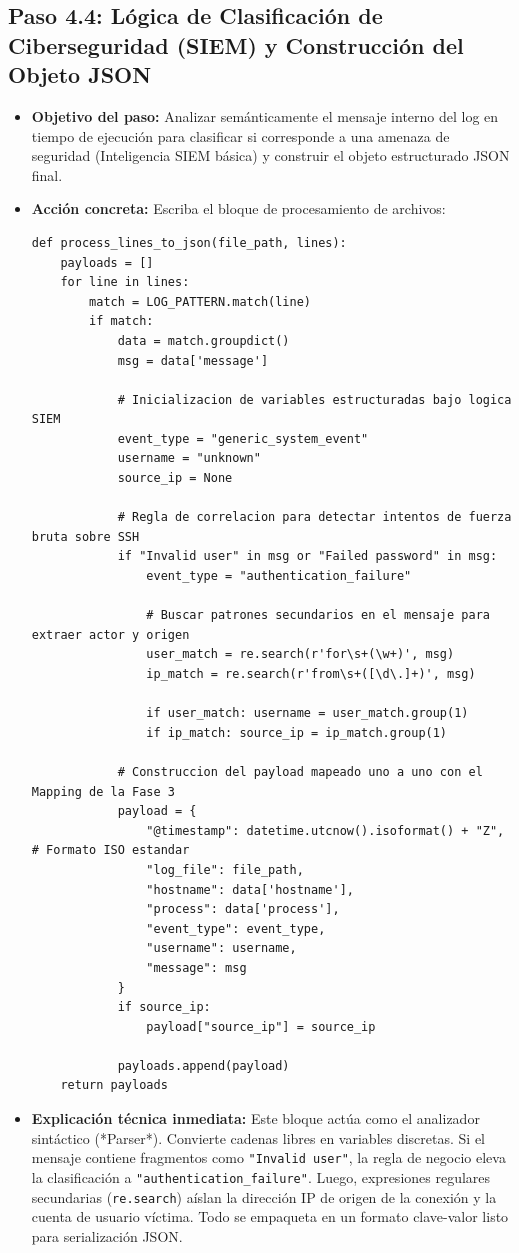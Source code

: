\documentclass[
  coursetitle={Cómputo Nube y Tecnologías Emergentes},
  coursehours={96},
  coursedate={Verano 2026},
  doctype={Guía de Laboratorio Práctico},
  otherlangs={english,french},
  authorname={Lázaro},
  authorsurname={Bustio-Martínez},
  authortitle={PhD},
  role={Profesor Investigador},
  email={lbustio@inaoe.mx},
  phone={5559504000},
  ext={7459},
  institution={Instituto Nacional de Astrofísica, Óptica y Electrónica (INAOE)},
  department={Maestría en Ciencias en Tecnologías de Seguridad},
  address={Luis Enrique Erro 1, Sta. Ma. Tonantzintla, San Andrés Cholula, CP 72840, Puebla, México},
  margin={0.5in}
]{../../lbustio_lecture_notes}
\begin{document}
\subsection{Paso 4.4: Lógica de Clasificación de Ciberseguridad (SIEM) y Construcción del Objeto JSON}
\begin{itemize}
    \item \textbf{Objetivo del paso:} Analizar semánticamente el mensaje interno del log en tiempo de ejecución para clasificar si corresponde a una amenaza de seguridad (Inteligencia SIEM básica) y construir el objeto estructurado JSON final.
    \item \textbf{Acción concreta:} Escriba el bloque de procesamiento de archivos:
\begin{verbatim}
def process_lines_to_json(file_path, lines):
    payloads = []
    for line in lines:
        match = LOG_PATTERN.match(line)
        if match:
            data = match.groupdict()
            msg = data['message']
            
            # Inicializacion de variables estructuradas bajo logica SIEM
            event_type = "generic_system_event"
            username = "unknown"
            source_ip = None
            
            # Regla de correlacion para detectar intentos de fuerza bruta sobre SSH
            if "Invalid user" in msg or "Failed password" in msg:
                event_type = "authentication_failure"
                
                # Buscar patrones secundarios en el mensaje para extraer actor y origen
                user_match = re.search(r'for\s+(\w+)', msg)
                ip_match = re.search(r'from\s+([\d\.]+)', msg)
                
                if user_match: username = user_match.group(1)
                if ip_match: source_ip = ip_match.group(1)
            
            # Construccion del payload mapeado uno a uno con el Mapping de la Fase 3
            payload = {
                "@timestamp": datetime.utcnow().isoformat() + "Z", # Formato ISO estandar
                "log_file": file_path,
                "hostname": data['hostname'],
                "process": data['process'],
                "event_type": event_type,
                "username": username,
                "message": msg
            }
            if source_ip:
                payload["source_ip"] = source_ip
            
            payloads.append(payload)
    return payloads
\end{verbatim}
    \item \textbf{Explicación técnica inmediata:} Este bloque actúa como el analizador sintáctico (*Parser*). Convierte cadenas libres en variables discretas. Si el mensaje contiene fragmentos como \texttt{"Invalid user"}, la regla de negocio eleva la clasificación a \texttt{"authentication\_failure"}. Luego, expresiones regulares secundarias (\texttt{re.search}) aíslan la dirección IP de origen de la conexión y la cuenta de usuario víctima. Todo se empaqueta en un formato clave-valor listo para serialización JSON.
\end{itemize}
\end{document}
